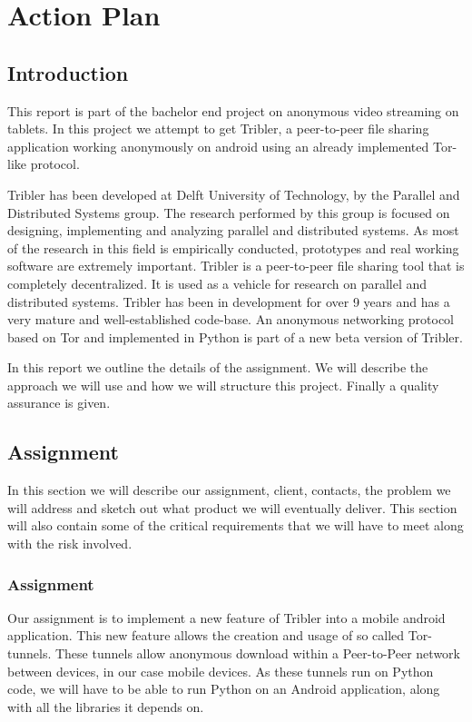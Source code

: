 \chapter{Action Plan}

\section{Introduction}
This report is part of the bachelor end project on anonymous video streaming on tablets. In this project we attempt to get Tribler, a peer-to-peer file sharing application working anonymously on android using an already implemented Tor-like protocol.

Tribler has been developed at Delft University of Technology, by the Parallel and Distributed Systems group. The research performed by this group is focused on designing, implementing and analyzing parallel and distributed systems. As most of the research in this field is empirically conducted, prototypes and real working software are extremely important. Tribler is a peer-to-peer file sharing tool that is completely decentralized. It is used as a vehicle for research on parallel and distributed systems. Tribler has been in development for over 9 years and has a very mature and well-established code-base. An anonymous networking protocol based on Tor and implemented in Python is part of a new beta version of Tribler.

In this report we outline the details of the assignment. We will describe the approach we will use and how we will structure this project. Finally a quality assurance is given.

\section{Assignment}
In this section we will describe our assignment, client, contacts, the problem we will address and sketch out what product we will eventually deliver. This section will also contain some of the critical requirements that we will have to meet along with the risk involved.

\subsection{Assignment}
Our assignment is to implement a new feature of Tribler into a mobile android application. This new feature allows the creation and usage of so called Tor-tunnels. These tunnels allow anonymous download within a Peer-to-Peer network between devices, in our case mobile devices.
As these tunnels run on Python code, we will have to be able to run Python on an Android application, along with all the libraries it depends on.

